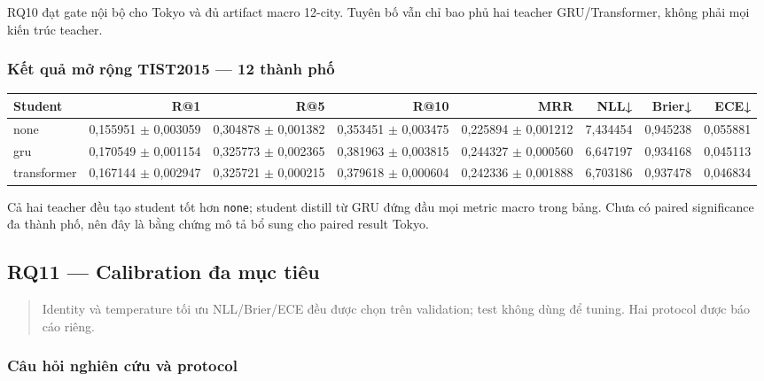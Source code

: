RQ10 đạt gate nội bộ cho Tokyo và đủ artifact macro 12-city. Tuyên bố vẫn chỉ bao phủ hai teacher GRU/Transformer, không phải mọi kiến trúc teacher.

\subsubsection*{Kết quả mở rộng TIST2015 --- 12 thành phố}

\begin{table}[!htbp]
\centering
\scriptsize
\setlength{\tabcolsep}{2.5pt}
\begin{adjustbox}{max width=\textwidth}
\begin{tabular}{@{}lrrrrrrr@{}}
\toprule
Student & R@1 & R@5 & R@10 & MRR & NLL↓ & Brier↓ & ECE↓ \\
\midrule
none & 0,155951 $\pm$ 0,003059 & 0,304878 $\pm$ 0,001382 & 0,353451 $\pm$ 0,003475 & 0,225894 $\pm$ 0,001212 & 7,434454 & 0,945238 & 0,055881 \\
gru & 0,170549 $\pm$ 0,001154 & 0,325773 $\pm$ 0,002365 & 0,381963 $\pm$ 0,003815 & 0,244327 $\pm$ 0,000560 & 6,647197 & 0,934168 & 0,045113 \\
transformer & 0,167144 $\pm$ 0,002947 & 0,325721 $\pm$ 0,000215 & 0,379618 $\pm$ 0,000604 & 0,242336 $\pm$ 0,001888 & 6,703186 & 0,937478 & 0,046834 \\
\bottomrule
\end{tabular}
\end{adjustbox}
\end{table}

Cả hai teacher đều tạo student tốt hơn \texttt{none}; student distill từ GRU đứng đầu mọi metric macro trong bảng. Chưa có paired significance đa thành phố, nên đây là bằng chứng mô tả bổ sung cho paired result Tokyo.


\subsection{RQ11 --- Calibration đa mục tiêu}

\begin{quote}\small Identity và temperature tối ưu NLL/Brier/ECE đều được chọn trên validation; test không dùng để tuning. Hai protocol được báo cáo riêng.\end{quote}
\subsubsection*{Câu hỏi nghiên cứu và protocol}

